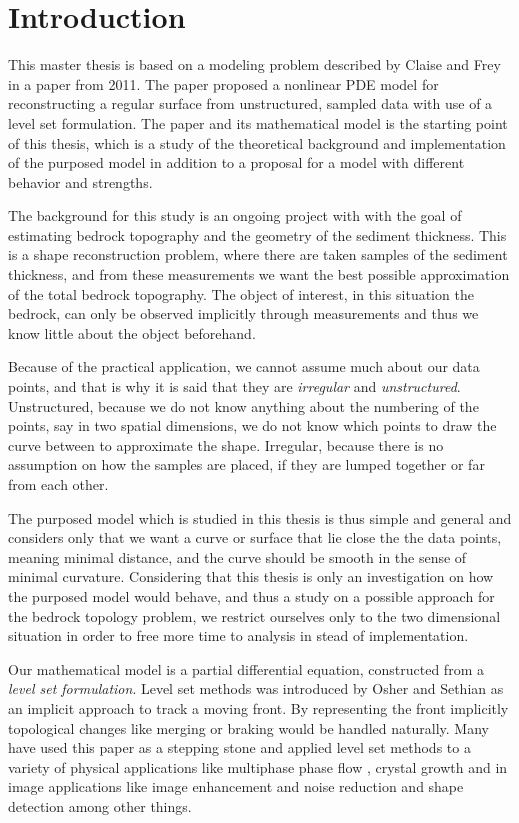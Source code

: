\chapter{Introduction} \label{chap:introduction}
This master thesis is based on a modeling problem described by Claise and Frey in a paper from 2011\cite{Claisse-Frey}. The paper proposed a nonlinear PDE model for reconstructing a regular surface from unstructured, sampled data with use of a level set formulation. The paper and its mathematical model is the starting point of this thesis, which is a study of the theoretical background and implementation of the purposed model in addition to a proposal for a model with different behavior and strengths. 

The background for this study is an ongoing project with  with the goal of estimating bedrock topography and the geometry of the sediment thickness. This is a shape reconstruction problem, where there are taken samples of the sediment thickness, and from these measurements we want the best possible approximation of the total bedrock topography. The object of interest, in this situation the bedrock, can only be observed implicitly through measurements and thus we know little about the object beforehand.

    Because of the practical application, we cannot assume much about our data points, and that is why it is said that they are \textit{irregular} and \textit{unstructured}. Unstructured, because we do not know anything about the numbering of the points, say in two spatial dimensions, we do not know which points to draw the curve between to approximate the shape. Irregular, because there is no assumption on how the samples are placed, if they are lumped together or far from each other.

The purposed model which is studied in this thesis is thus simple and general and considers only that we want a curve or surface that lie close the the data points, meaning minimal distance, and the curve should be smooth in the sense of minimal curvature. Considering that this thesis is only an investigation on how the purposed model would behave, and thus a study on a possible approach for the bedrock topology problem, we restrict ourselves only to the two dimensional situation in order to free more time to analysis in stead of implementation. 

Our mathematical model is a partial differential equation, constructed from a \textit{level set formulation}. Level set methods was introduced by Osher and Sethian\cite{Osher-Sethian} as an implicit approach to track a moving front. By representing the front implicitly topological changes like merging or braking would be handled naturally. Many have used this paper as a stepping stone and applied level set methods to a variety of physical applications like multiphase phase flow \cite{SUSSMAN1994146} \cite{ZHAO1996179}, crystal growth \cite{sethian1999level} and in image applications like image enhancement and noise reduction \cite{sethian1999level} \cite{RUDIN1992259} and shape detection \cite{368173} \cite{sethian1999level} \cite{5754584} among other things.

